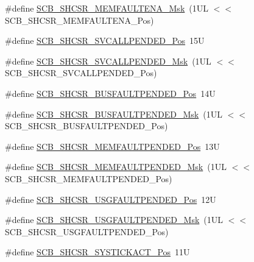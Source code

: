 \begin{DoxyCompactItemize}
\item 
\#define \mbox{\hyperlink{group___c_m_s_i_s___s_c_b_gaf084424fa1f69bea36a1c44899d83d17}{S\+C\+B\+\_\+\+S\+H\+C\+S\+R\+\_\+\+M\+E\+M\+F\+A\+U\+L\+T\+E\+N\+A\+\_\+\+Msk}}~(1\+U\+L $<$$<$ S\+C\+B\+\_\+\+S\+H\+C\+S\+R\+\_\+\+M\+E\+M\+F\+A\+U\+L\+T\+E\+N\+A\+\_\+\+Pos)
\item 
\#define \mbox{\hyperlink{group___c_m_s_i_s___s_c_b_ga2f93ec9b243f94cdd3e94b8f0bf43641}{S\+C\+B\+\_\+\+S\+H\+C\+S\+R\+\_\+\+S\+V\+C\+A\+L\+L\+P\+E\+N\+D\+E\+D\+\_\+\+Pos}}~15U
\item 
\#define \mbox{\hyperlink{group___c_m_s_i_s___s_c_b_ga6095a7acfbad66f52822b1392be88652}{S\+C\+B\+\_\+\+S\+H\+C\+S\+R\+\_\+\+S\+V\+C\+A\+L\+L\+P\+E\+N\+D\+E\+D\+\_\+\+Msk}}~(1\+U\+L $<$$<$ S\+C\+B\+\_\+\+S\+H\+C\+S\+R\+\_\+\+S\+V\+C\+A\+L\+L\+P\+E\+N\+D\+E\+D\+\_\+\+Pos)
\item 
\#define \mbox{\hyperlink{group___c_m_s_i_s___s_c_b_gaa22551e24a72b65f1e817f7ab462203b}{S\+C\+B\+\_\+\+S\+H\+C\+S\+R\+\_\+\+B\+U\+S\+F\+A\+U\+L\+T\+P\+E\+N\+D\+E\+D\+\_\+\+Pos}}~14U
\item 
\#define \mbox{\hyperlink{group___c_m_s_i_s___s_c_b_ga677c23749c4d348f30fb471d1223e783}{S\+C\+B\+\_\+\+S\+H\+C\+S\+R\+\_\+\+B\+U\+S\+F\+A\+U\+L\+T\+P\+E\+N\+D\+E\+D\+\_\+\+Msk}}~(1\+U\+L $<$$<$ S\+C\+B\+\_\+\+S\+H\+C\+S\+R\+\_\+\+B\+U\+S\+F\+A\+U\+L\+T\+P\+E\+N\+D\+E\+D\+\_\+\+Pos)
\item 
\#define \mbox{\hyperlink{group___c_m_s_i_s___s_c_b_gaceb60fe2d8a8cb17fcd1c1f6b5aa924f}{S\+C\+B\+\_\+\+S\+H\+C\+S\+R\+\_\+\+M\+E\+M\+F\+A\+U\+L\+T\+P\+E\+N\+D\+E\+D\+\_\+\+Pos}}~13U
\item 
\#define \mbox{\hyperlink{group___c_m_s_i_s___s_c_b_ga9abc6c2e395f9e5af4ce05fc420fb04c}{S\+C\+B\+\_\+\+S\+H\+C\+S\+R\+\_\+\+M\+E\+M\+F\+A\+U\+L\+T\+P\+E\+N\+D\+E\+D\+\_\+\+Msk}}~(1\+U\+L $<$$<$ S\+C\+B\+\_\+\+S\+H\+C\+S\+R\+\_\+\+M\+E\+M\+F\+A\+U\+L\+T\+P\+E\+N\+D\+E\+D\+\_\+\+Pos)
\item 
\#define \mbox{\hyperlink{group___c_m_s_i_s___s_c_b_ga3cf03acf1fdc2edc3b047ddd47ebbf87}{S\+C\+B\+\_\+\+S\+H\+C\+S\+R\+\_\+\+U\+S\+G\+F\+A\+U\+L\+T\+P\+E\+N\+D\+E\+D\+\_\+\+Pos}}~12U
\item 
\#define \mbox{\hyperlink{group___c_m_s_i_s___s_c_b_ga122b4f732732010895e438803a29d3cc}{S\+C\+B\+\_\+\+S\+H\+C\+S\+R\+\_\+\+U\+S\+G\+F\+A\+U\+L\+T\+P\+E\+N\+D\+E\+D\+\_\+\+Msk}}~(1\+U\+L $<$$<$ S\+C\+B\+\_\+\+S\+H\+C\+S\+R\+\_\+\+U\+S\+G\+F\+A\+U\+L\+T\+P\+E\+N\+D\+E\+D\+\_\+\+Pos)
\item 
\#define \mbox{\hyperlink{group___c_m_s_i_s___s_c_b_gaec9ca3b1213c49e2442373445e1697de}{S\+C\+B\+\_\+\+S\+H\+C\+S\+R\+\_\+\+S\+Y\+S\+T\+I\+C\+K\+A\+C\+T\+\_\+\+Pos}}~11U
$$
\end{DoxyCompactItemize}
